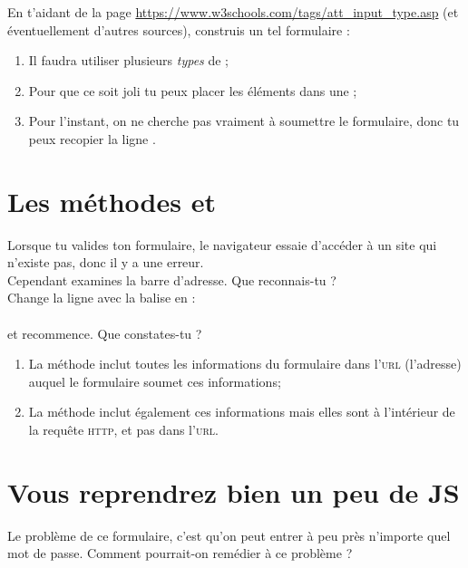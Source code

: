 \documentclass[a4paper,11pt]{book}
\begin{document}
\begin{exercice}[]
En t'aidant de la page \url{https://www.w3schools.com/tags/att_input_type.asp} (et éventuellement d'autres sources), construis un tel formulaire :
\begin{enumerate}[--]
	\item 	Il faudra utiliser plusieurs \textit{types} de ;
	\item 	Pour que ce soit joli tu peux placer les éléments dans une ;
	\item 	Pour l'instant, on ne cherche pas vraiment à soumettre le formulaire, donc tu peux recopier la ligne 
			.
\end{enumerate}

\end{exercice}

\section*{Les méthodes  et }


\begin{exercice}[]
Lorsque tu valides ton formulaire, le navigateur essaie d'accéder à un site qui n'existe pas, donc il y a une erreur.\\
Cependant examines la barre d'adresse. Que reconnais-tu ?\\

Change la ligne avec la balise  en :\\
\\ et recommence. Que constates-tu ?
\end{exercice}

\begin{enumerate}[--]
	\item 	La méthode  inclut toutes les informations du formulaire dans l'\textsc{url} (l'adresse) auquel le formulaire soumet ces informations;
	\item 	La méthode  inclut également ces informations mais elles sont à l'intérieur de la requête \textsc{http}, et pas dans l'\textsc{url}.
\end{enumerate}

\section*{Vous reprendrez bien un peu de JS}

Le problème de ce formulaire, c'est qu'on peut entrer à peu près n'importe quel mot de passe.
Comment pourrait-on remédier à ce problème ?
\end{document}
